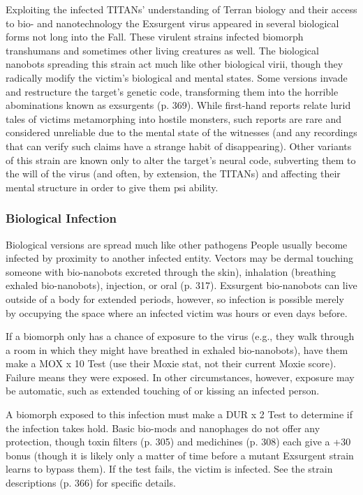 Exploiting the infected TITANs' understanding of 
Terran biology and their access to bio- and nanotechnology
the Exsurgent virus appeared in several biological
forms not long into the Fall. These virulent strains
infected biomorph transhumans and sometimes other 
living creatures as well. The biological nanobots 
spreading this strain act much like other biological 
virii, though they radically modify the victim's biological
and mental states. Some versions invade and
restructure the target's genetic code, transforming 
them into the horrible abominations known as exsurgents
(p. 369). While first-hand reports relate lurid
tales of victims metamorphing into hostile monsters, 
such reports are rare and considered unreliable due to 
the mental state of the witnesses (and any recordings 
that can verify such claims have a strange habit of 
disappearing). Other variants of this strain are known 
only to alter the target's neural code, subverting them 
to the will of the virus (and often, by extension, the 
TITANs) and affecting their mental structure in order 
to give them psi ability.

\subsubsection{Biological Infection}

Biological versions are spread much like other pathogens
People usually become infected by proximity to
another infected entity. Vectors may be dermal touching
someone with bio-nanobots excreted through the
skin), inhalation (breathing exhaled bio-nanobots), 
injection, or oral (p. 317). Exsurgent bio-nanobots can 
live outside of a body for extended periods, however, 
so infection is possible merely by occupying the space 
where an infected victim was hours or even days before.

If a biomorph only has a chance of exposure to the 
virus (e.g., they walk through a room in which they 
might have breathed in exhaled bio-nanobots), have 
them make a MOX x 10 Test (use their Moxie stat, 
not their current Moxie score). Failure means they 
were exposed. In other circumstances, however, exposure
may be automatic, such as extended touching of
or kissing an infected person. 

A biomorph exposed to this infection must make 
a DUR x 2 Test to determine if the infection takes 
hold. Basic bio-mods and nanophages do not offer 
any protection, though toxin filters (p. 305) and 
medichines (p. 308) each give a +30 bonus (though it 
is likely only a matter of time before a mutant Exsurgent
strain learns to bypass them). If the test fails, the
victim is infected. See the strain descriptions (p. 366) 
for specific details.

